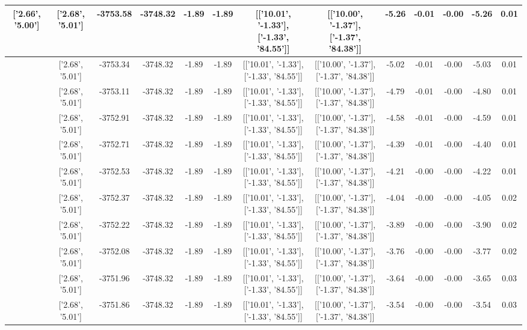 \begin{table}[htbp]
\begin{adjustbox}{angle=90}
\begin{tabular}{|c|c|c|c|c|c|c|c|c|c|c|c|c|}
 ['2.66', '5.00'] & ['2.68', '5.01'] & -3753.58 & -3748.32 & -1.89 & -1.89 & [['10.01', '-1.33'], ['-1.33', '84.55']] & [['10.00', '-1.37'], ['-1.37', '84.38']] & -5.26 & -0.01 & -0.00 & -5.26 & 0.01\\ \hline
 ['2.66', '5.00'] & ['2.68', '5.01'] & -3753.34 & -3748.32 & -1.89 & -1.89 & [['10.01', '-1.33'], ['-1.33', '84.55']] & [['10.00', '-1.37'], ['-1.37', '84.38']] & -5.02 & -0.01 & -0.00 & -5.03 & 0.01\\ \hline
 ['2.67', '5.00'] & ['2.68', '5.01'] & -3753.11 & -3748.32 & -1.89 & -1.89 & [['10.01', '-1.33'], ['-1.33', '84.55']] & [['10.00', '-1.37'], ['-1.37', '84.38']] & -4.79 & -0.01 & -0.00 & -4.80 & 0.01\\ \hline
 ['2.67', '5.00'] & ['2.68', '5.01'] & -3752.91 & -3748.32 & -1.89 & -1.89 & [['10.01', '-1.33'], ['-1.33', '84.55']] & [['10.00', '-1.37'], ['-1.37', '84.38']] & -4.58 & -0.01 & -0.00 & -4.59 & 0.01\\ \hline
 ['2.67', '5.00'] & ['2.68', '5.01'] & -3752.71 & -3748.32 & -1.89 & -1.89 & [['10.01', '-1.33'], ['-1.33', '84.55']] & [['10.00', '-1.37'], ['-1.37', '84.38']] & -4.39 & -0.01 & -0.00 & -4.40 & 0.01\\ \hline
 ['2.67', '5.00'] & ['2.68', '5.01'] & -3752.53 & -3748.32 & -1.89 & -1.89 & [['10.01', '-1.33'], ['-1.33', '84.55']] & [['10.00', '-1.37'], ['-1.37', '84.38']] & -4.21 & -0.00 & -0.00 & -4.22 & 0.01\\ \hline
 ['2.67', '5.00'] & ['2.68', '5.01'] & -3752.37 & -3748.32 & -1.89 & -1.89 & [['10.01', '-1.33'], ['-1.33', '84.55']] & [['10.00', '-1.37'], ['-1.37', '84.38']] & -4.04 & -0.00 & -0.00 & -4.05 & 0.02\\ \hline
 ['2.67', '5.00'] & ['2.68', '5.01'] & -3752.22 & -3748.32 & -1.89 & -1.89 & [['10.01', '-1.33'], ['-1.33', '84.55']] & [['10.00', '-1.37'], ['-1.37', '84.38']] & -3.89 & -0.00 & -0.00 & -3.90 & 0.02\\ \hline
 ['2.67', '5.00'] & ['2.68', '5.01'] & -3752.08 & -3748.32 & -1.89 & -1.89 & [['10.01', '-1.33'], ['-1.33', '84.55']] & [['10.00', '-1.37'], ['-1.37', '84.38']] & -3.76 & -0.00 & -0.00 & -3.77 & 0.02\\ \hline
 ['2.67', '5.00'] & ['2.68', '5.01'] & -3751.96 & -3748.32 & -1.89 & -1.89 & [['10.01', '-1.33'], ['-1.33', '84.55']] & [['10.00', '-1.37'], ['-1.37', '84.38']] & -3.64 & -0.00 & -0.00 & -3.65 & 0.03\\ \hline
 ['2.68', '5.00'] & ['2.68', '5.01'] & -3751.86 & -3748.32 & -1.89 & -1.89 & [['10.01', '-1.33'], ['-1.33', '84.55']] & [['10.00', '-1.37'], ['-1.37', '84.38']] & -3.54 & -0.00 & -0.00 & -3.54 & 0.03\\ \hline

\end{tabular}
\end{adjustbox}
\end{table}

